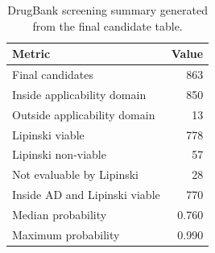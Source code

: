 \begin{table}[H]
\centering
\caption{DrugBank screening summary generated from the final candidate table.}
\label{tab:py_drugbank_summary}
\begin{tabular}{lr}
\toprule
Metric & Value \\
\midrule
Final candidates & 863 \\
Inside applicability domain & 850 \\
Outside applicability domain & 13 \\
Lipinski viable & 778 \\
Lipinski non-viable & 57 \\
Not evaluable by Lipinski & 28 \\
Inside AD and Lipinski viable & 770 \\
Median probability & 0.760 \\
Maximum probability & 0.990 \\
\bottomrule
\end{tabular}
\end{table}
